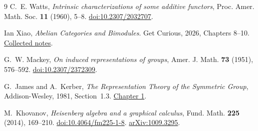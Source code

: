 \documentclass[11pt,a4paper]{article}
\numberwithin{equation}{section}
\theoremstyle{definition}
\begin{document}
\begin{thebibliography}{9}
C.~E. Watts, \emph{Intrinsic characterizations of some additive functors},
Proc. Amer. Math. Soc. \textbf{11} (1960), 5--8.
\href{https://doi.org/10.2307/2032707}{doi:10.2307/2032707}.

Ian Xiao, \emph{Abelian Categories and Bimodules}.
Get Curious, 2026, Chapters 8--10.
\href{https://getcurious.cc/downloads/abelian-categories-and-bimodules-lecture-notes.pdf}{Collected notes}.

G.~W. Mackey, \emph{On induced representations of groups},
Amer. J. Math. \textbf{73} (1951), 576--592.
\href{https://doi.org/10.2307/2372309}{doi:10.2307/2372309}.

G.~James and A.~Kerber, \emph{The Representation Theory of the Symmetric
Group}, Addison-Wesley, 1981, Section~1.3.
\href{https://www.cambridge.org/core/books/abs/representation-theory-of-the-symmetric-group/symmetric-groups-and-their-young-subgroups/F308612FED7EEF675EB29ED670C6528E}{Chapter 1}.

M.~Khovanov, \emph{Heisenberg algebra and a graphical calculus},
Fund. Math. \textbf{225} (2014), 169--210.
\href{https://doi.org/10.4064/fm225-1-8}{doi:10.4064/fm225-1-8}.
\href{https://arxiv.org/abs/1009.3295}{arXiv:1009.3295}.

\end{thebibliography}
\end{document}
